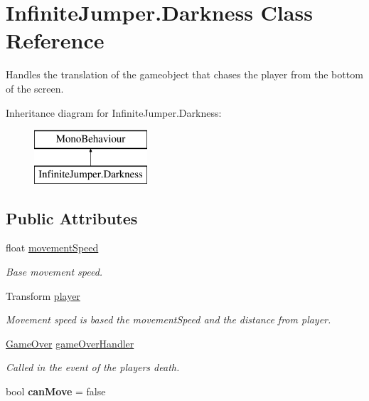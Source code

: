 \hypertarget{class_infinite_jumper_1_1_darkness}{}\section{Infinite\+Jumper.\+Darkness Class Reference}
\label{class_infinite_jumper_1_1_darkness}


Handles the translation of the gameobject that chases the player from the bottom of the screen.  


Inheritance diagram for Infinite\+Jumper.\+Darkness\+:\begin{figure}[H]
\begin{center}
\leavevmode
\includegraphics[height=2.000000cm]{class_infinite_jumper_1_1_darkness}
\end{center}
\end{figure}
\subsection*{Public Attributes}
\begin{DoxyCompactItemize}
\item 
float \hyperlink{class_infinite_jumper_1_1_darkness_a355795f32e1f1aaa853e469b0129903e}{movement\+Speed}
\begin{DoxyCompactList}\small\item\em Base movement speed. \end{DoxyCompactList}\item 
Transform \hyperlink{class_infinite_jumper_1_1_darkness_acaeaa5d8e8335dbae8a33f9841553f2d}{player}
\begin{DoxyCompactList}\small\item\em Movement speed is based the movement\+Speed and the distance from player. \end{DoxyCompactList}\item 
\hyperlink{class_infinite_jumper_1_1_game_over}{Game\+Over} \hyperlink{class_infinite_jumper_1_1_darkness_adace7d7f3310201b815f1a488c0cbbcf}{game\+Over\+Handler}
\begin{DoxyCompactList}\small\item\em Called in the event of the players death. \end{DoxyCompactList}\item 
\hypertarget{class_infinite_jumper_1_1_darkness_afbc79e7019898582e48e0736264bebc6}{}bool {\bfseries can\+Move} = false\label{class_infinite_jumper_1_1_darkness_afbc79e7019898582e48e0736264bebc6}

\end{DoxyCompactItemize}



